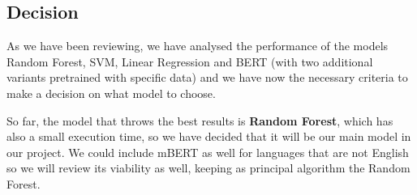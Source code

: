 \subsection{Decision}
As we have been reviewing, we have analysed the performance of the models Random Forest, SVM, Linear Regression and BERT (with two additional variants pretrained with specific data) and we have now the necessary criteria to make a decision on what model to choose.

So far, the model that throws the best results is \textbf{Random Forest}, which has also a small execution time, so we have decided that it will be our main model in our project. We could include mBERT as well for languages that are not English so we will review its viability as well, keeping as principal algorithm the Random Forest.
